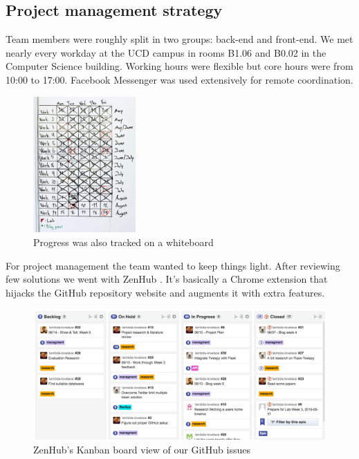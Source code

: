 \documentclass{article}
\begin{document}
\subsection{Project management strategy} 
Team members were roughly split in two groups: back-end and front-end. We met nearly every workday at the UCD campus in rooms B1.06 and B0.02 in the Computer Science building. Working hours were flexible but core hours were from 10:00 to 17:00. Facebook Messenger \cite{messenger} was used extensively for remote coordination.

\begin{figure}[H]
    \centering
    \includegraphics[width=0.35\textwidth]{whiteboard2}
    \caption{Progress was also tracked on a whiteboard}
\end{figure}

For project management the team wanted to keep things light. After reviewing few solutions \cite{ll-blog-week2} we went with ZenHub \cite{zenhub}. It's basically a Chrome extension that hijacks the GitHub repository website and augments it with extra features.

\begin{figure}[H]
    \centering
    \includegraphics[width=\textwidth]{kanbanboard}
    \caption{ZenHub's Kanban board view of our GitHub issues}
\end{figure}
\end{document}
